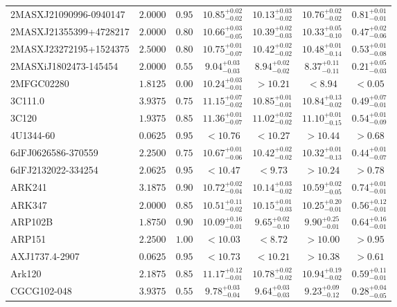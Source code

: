 \documentclass[onecolumn]{mn2e}
\begin{document}
{\begin{center}
\begin{longtable}{lcccccc}
2MASXJ21090996-0940147 & $2.0000$ & $0.95$ & $10.85_{-0.02}^{+0.02}$ & $10.13_{-0.02}^{+0.03}$ & $10.76_{-0.02}^{+0.02}$ &$0.81_{-0.01}^{+0.01}$ \\
2MASXJ21355399+4728217 & $2.0000$ & $0.80$ & $10.66_{-0.05}^{+0.03}$ & $10.39_{-0.03}^{+0.02}$ & $10.33_{-0.10}^{+0.05}$ &$0.47_{-0.06}^{+0.02}$ \\
2MASXJ23272195+1524375 & $2.5000$ & $0.80$ & $10.75_{-0.07}^{+0.01}$ & $10.42_{-0.02}^{+0.02}$ & $10.48_{-0.14}^{+0.01}$ &$0.53_{-0.08}^{+0.01}$ \\
2MASXiJ1802473-145454 & $2.0000$ & $0.55$ & $9.04_{-0.03}^{+0.03}$ & $8.94_{-0.02}^{+0.02}$ & $8.37_{-0.11}^{+0.11}$ &$0.21_{-0.03}^{+0.05}$ \\
2MFGC02280 & $1.8125$ & $0.00$ & $10.24_{-0.01}^{+0.03}$ & $>10.21$ & $<8.94$ &$<0.05$ \\
3C111.0 & $3.9375$ & $0.75$ & $11.15_{-0.02}^{+0.07}$ & $10.85_{-0.01}^{+0.01}$ & $10.84_{-0.02}^{+0.13}$ &$0.49_{-0.01}^{+0.07}$ \\
3C120 & $1.9375$ & $0.85$ & $11.36_{-0.07}^{+0.01}$ & $11.02_{-0.02}^{+0.02}$ & $11.10_{-0.15}^{+0.01}$ &$0.54_{-0.09}^{+0.01}$ \\
4U1344-60 & $0.0625$ & $0.95$ & $<10.76$ & $<10.27$ & $>10.44$ &$>0.68$ \\
6dFJ0626586-370559 & $2.2500$ & $0.75$ & $10.67_{-0.06}^{+0.01}$ & $10.42_{-0.02}^{+0.02}$ & $10.32_{-0.13}^{+0.01}$ &$0.44_{-0.07}^{+0.01}$ \\
6dFJ2132022-334254 & $2.0625$ & $0.95$ & $<10.47$ & $<9.73$ & $>10.24$ &$>0.78$ \\
ARK241 & $3.1875$ & $0.90$ & $10.72_{-0.04}^{+0.02}$ & $10.14_{-0.02}^{+0.03}$ & $10.59_{-0.05}^{+0.02}$ &$0.74_{-0.01}^{+0.01}$ \\
ARK347 & $2.0000$ & $0.85$ & $10.51_{-0.02}^{+0.11}$ & $10.15_{-0.03}^{+0.01}$ & $10.25_{-0.01}^{+0.20}$ &$0.56_{-0.01}^{+0.12}$ \\
ARP102B & $1.8750$ & $0.90$ & $10.09_{-0.01}^{+0.16}$ & $9.65_{-0.10}^{+0.02}$ & $9.90_{-0.01}^{+0.25}$ &$0.64_{-0.01}^{+0.16}$ \\
ARP151 & $2.2500$ & $1.00$ & $<10.03$ & $<8.72$ & $>10.00$ &$>0.95$ \\
AXJ1737.4-2907 & $0.0625$ & $0.95$ & $<10.73$ & $<10.21$ & $>10.38$ &$>0.61$ \\
Ark120 & $2.1875$ & $0.85$ & $11.17_{-0.01}^{+0.12}$ & $10.78_{-0.02}^{+0.02}$ & $10.94_{-0.02}^{+0.19}$ &$0.59_{-0.01}^{+0.11}$ \\
CGCG102-048 & $3.9375$ & $0.55$ & $9.78_{-0.04}^{+0.03}$ & $9.64_{-0.03}^{+0.03}$ & $9.23_{-0.12}^{+0.09}$ &$0.28_{-0.05}^{+0.04}$ \\

\end{longtable}
\end{center}}
\end{document}

